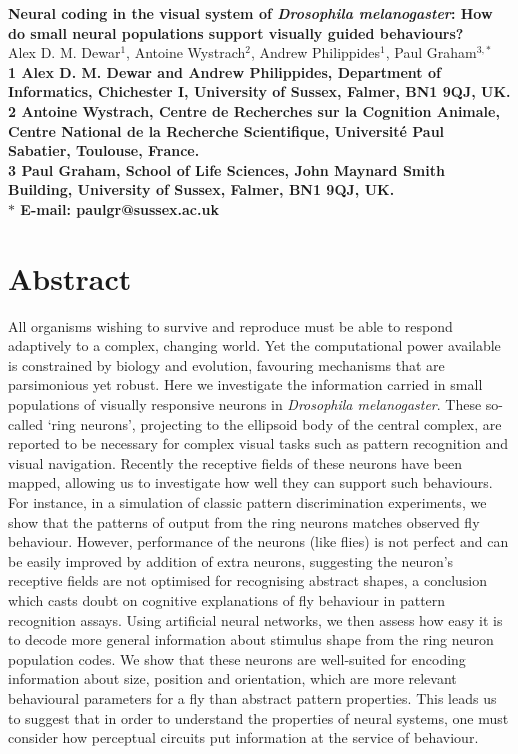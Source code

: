 \documentclass[10pt]{article}
\date{}
\begin{document}
\begin{flushleft}
{\Large
\textbf{Neural coding in the visual system of \emph{Drosophila melanogaster}: How do small neural populations support visually guided behaviours?}
}
\\
Alex D. M. Dewar$^{1}$,
Antoine Wystrach$^{2}$,
Andrew Philippides$^{1}$,
Paul Graham$^{3,\ast}$
\\
\bf{1} Alex D. M. Dewar and Andrew Philippides, Department of Informatics, Chichester I, University of Sussex, Falmer, BN1 9QJ, UK.
\\
\bf{2} Antoine Wystrach, Centre de Recherches sur la Cognition Animale, Centre National de la Recherche Scientifique, Université Paul Sabatier, Toulouse, France.
\\
\bf{3} Paul Graham, School of Life Sciences, John Maynard Smith Building, University of Sussex, Falmer, BN1 9QJ, UK.
\\
$\ast$ E-mail: paulgr@sussex.ac.uk
\end{flushleft}

\section*{Abstract}
All organisms wishing to survive and reproduce must be able to respond adaptively to a complex, changing world. Yet the computational power available is constrained by biology and evolution, favouring mechanisms that are parsimonious yet robust. Here we investigate the information carried in small populations of visually responsive neurons in \emph{Drosophila melanogaster}. These so-called `ring neurons', projecting to the ellipsoid body of the central complex, are reported to be necessary for complex visual tasks such as pattern recognition and visual navigation. Recently the receptive fields of these neurons have been mapped, allowing us to investigate how well they can support such behaviours. For instance, in a simulation of classic pattern discrimination experiments, we show that the patterns of output from the ring neurons matches observed fly behaviour. However, performance of the neurons (like flies) is not perfect and can be easily improved by addition of extra neurons, suggesting the neuron's receptive fields are not optimised for recognising abstract shapes, a conclusion which casts doubt on cognitive explanations of fly behaviour in pattern recognition assays. Using artificial neural networks, we then assess how easy it is to decode more general information about stimulus shape from the ring neuron population codes. We show that these neurons are well-suited for encoding information about size, position and orientation, which are more relevant behavioural parameters for a fly than abstract pattern properties. This leads us to suggest that in order to understand the properties of neural systems, one must consider how perceptual circuits put information at the service of behaviour.
\end{document}

